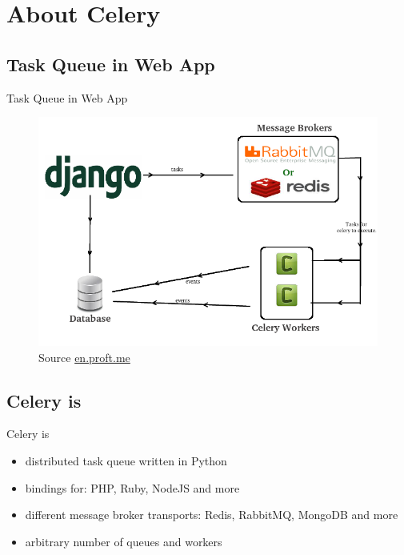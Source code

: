 \documentclass[xcolor=x11names,compress,t]{beamer}
\renewcommand{\(}{\begin{columns}[T]}
\renewcommand{\)}{\end{columns}}
\newcommand{\<}[1]{\begin{column}{#1}}
\renewcommand{\>}{\end{column}}
\newenvironment{slide}[1]{\subsection{#1} \begin{frame}{#1}}{\end{frame}}
\begin{document}
\section{About Celery}
\begin{slide}{Task Queue in Web App}
    \begin{figure}
        \includegraphics[scale=0.42]{django-celery-architecture}
        \caption{Source \href{http://en.proft.me/2013/10/25/celery-periodic-tasks-django-projects/}{en.proft.me}}
    \end{figure}
\end{slide}

\begin{slide}{Celery is}
    \begin{itemize}
        \item distributed task queue written in Python
        \item bindings for: PHP, Ruby, NodeJS and more
        \item different message broker transports: Redis, RabbitMQ, MongoDB and more
        \item arbitrary number of queues and workers
    \end{itemize}
\end{slide}
\end{document}
